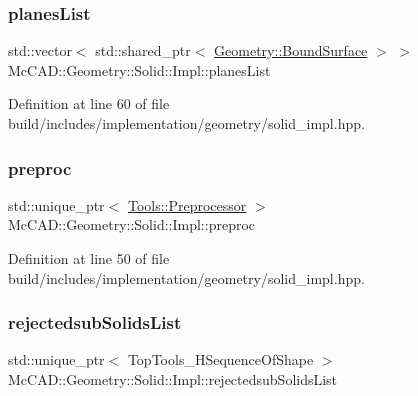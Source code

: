 \subsubsection{\texorpdfstring{planes\+List}{planesList}}
{\footnotesize\ttfamily std\+::vector$<$ std\+::shared\+\_\+ptr$<$ \hyperlink{classMcCAD_1_1Geometry_1_1BoundSurface}{Geometry\+::\+Bound\+Surface} $>$ $>$ Mc\+C\+A\+D\+::\+Geometry\+::\+Solid\+::\+Impl\+::planes\+List}



Definition at line 60 of file build/includes/implementation/geometry/solid\+\_\+impl.\+hpp.

\mbox{\label{classMcCAD_1_1Geometry_1_1Solid_1_1Impl_ab6393d9ccf9e8046915b6f2b1facfb03}} 
\subsubsection{\texorpdfstring{preproc}{preproc}}
{\footnotesize\ttfamily std\+::unique\+\_\+ptr$<$ \hyperlink{classMcCAD_1_1Tools_1_1Preprocessor}{Tools\+::\+Preprocessor} $>$ Mc\+C\+A\+D\+::\+Geometry\+::\+Solid\+::\+Impl\+::preproc}



Definition at line 50 of file build/includes/implementation/geometry/solid\+\_\+impl.\+hpp.

\mbox{\label{classMcCAD_1_1Geometry_1_1Solid_1_1Impl_a464bf027934dad6084175700222b1582}} 
\subsubsection{\texorpdfstring{rejectedsub\+Solids\+List}{rejectedsubSolidsList}}
{\footnotesize\ttfamily std\+::unique\+\_\+ptr$<$ Top\+Tools\+\_\+\+H\+Sequence\+Of\+Shape $>$ Mc\+C\+A\+D\+::\+Geometry\+::\+Solid\+::\+Impl\+::rejectedsub\+Solids\+List}



